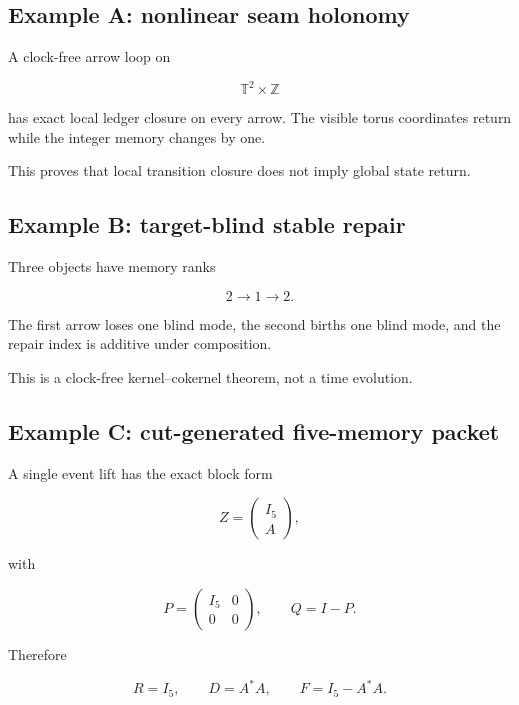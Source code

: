 \hypertarget{example-a-nonlinear-seam-holonomy}{%
\subsection{Example A: nonlinear seam holonomy}\label{example-a-nonlinear-seam-holonomy}}

A clock-free arrow loop on

\[
\mathbb T^2\times\mathbb Z
\]

has exact local ledger closure on every arrow. The visible torus coordinates
return while the integer memory changes by one.

This proves that local transition closure does not imply global state return.

\hypertarget{example-b-target-blind-stable-repair}{%
\subsection{Example B: target-blind stable repair}\label{example-b-target-blind-stable-repair}}

Three objects have memory ranks

\[
2\longrightarrow1\longrightarrow2.
\]

The first arrow loses one blind mode, the second births one blind mode, and the
repair index is additive under composition.

This is a clock-free kernel--cokernel theorem, not a time evolution.

\hypertarget{example-c-cut-generated-five-memory-packet}{%
\subsection{Example C: cut-generated five-memory packet}\label{example-c-cut-generated-five-memory-packet}}

A single event lift has the exact block form

\[
Z=
\begin{pmatrix}
I_5\\
A
\end{pmatrix},
\]

with

\[
P=
\begin{pmatrix}
I_5&0\\0&0
\end{pmatrix},
\qquad
Q=I-P.
\]

Therefore

\[
R=I_5,
\qquad
D=A^*A,
\qquad
F=I_5-A^*A.
\]

